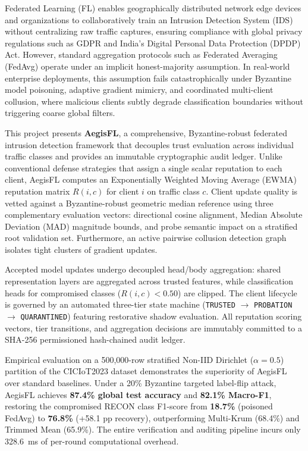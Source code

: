 \documentclass[12pt,a4paper]{report}
\begin{document}
Federated Learning (FL) enables geographically distributed network edge devices and organizations to collaboratively train an Intrusion Detection System (IDS) without centralizing raw traffic captures, ensuring compliance with global privacy regulations such as GDPR and India's Digital Personal Data Protection (DPDP) Act. However, standard aggregation protocols such as Federated Averaging (FedAvg) operate under an implicit honest-majority assumption. In real-world enterprise deployments, this assumption fails catastrophically under Byzantine model poisoning, adaptive gradient mimicry, and coordinated multi-client collusion, where malicious clients subtly degrade classification boundaries without triggering coarse global filters.

This project presents \textbf{AegisFL}, a comprehensive, Byzantine-robust federated intrusion detection framework that decouples trust evaluation across individual traffic classes and provides an immutable cryptographic audit ledger. Unlike conventional defense strategies that assign a single scalar reputation to each client, AegisFL computes an Exponentially Weighted Moving Average (EWMA) reputation matrix $R(i, c)$ for client $i$ on traffic class $c$. Client update quality is vetted against a Byzantine-robust geometric median reference using three complementary evaluation vectors: directional cosine alignment, Median Absolute Deviation (MAD) magnitude bounds, and probe semantic impact on a stratified root validation set. Furthermore, an active pairwise collusion detection graph isolates tight clusters of gradient updates.

Accepted model updates undergo decoupled head/body aggregation: shared representation layers are aggregated across trusted features, while classification heads for compromised classes ($R(i,c) < 0.50$) are clipped. The client lifecycle is governed by an automated three-tier state machine (\texttt{TRUSTED} $\to$ \texttt{PROBATION} $\to$ \texttt{QUARANTINED}) featuring restorative shadow evaluation. All reputation scoring vectors, tier transitions, and aggregation decisions are immutably committed to a SHA-256 permissioned hash-chained audit ledger.

Empirical evaluation on a 500,000-row stratified Non-IID Dirichlet ($\alpha = 0.5$) partition of the CICIoT2023 dataset demonstrates the superiority of AegisFL over standard baselines. Under a 20\% Byzantine targeted label-flip attack, AegisFL achieves \textbf{87.4\% global test accuracy} and \textbf{82.1\% Macro-F1}, restoring the compromised RECON class F1-score from \textbf{18.7\%} (poisoned FedAvg) to \textbf{76.8\%} (+58.1 pp recovery), outperforming Multi-Krum (68.4\%) and Trimmed Mean (65.9\%). The entire verification and auditing pipeline incurs only 328.6~ms of per-round computational overhead.
\end{document}
